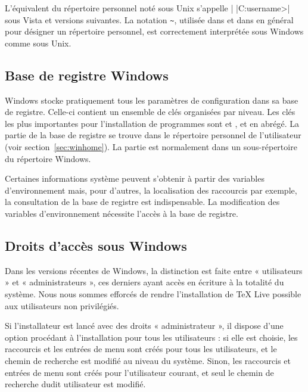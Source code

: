\documentclass[german, english, french]{article}
\renewcommand{\TL}{\TeX{} Live\xspace}%
\begin{document}
L'équivalent du répertoire personnel noté  sous Unix s'appelle
|%
|C:\Utilisateurs\<username>| sous Vista et versions suivantes.  La notation
\verb|~|, utilisée dans  et dans \KPS{} en général pour
désigner un répertoire personnel, est correctement interprétée sous Windows
comme sous Unix.


\subsection{Base de registre Windows}
\label{sec:registry}

Windows stocke pratiquement tous les paramètres de configuration dans sa base de
registre. Celle-ci contient un ensemble de clés organisées par niveau.  Les clés
les plus importantes pour l'installation de programmes sont
 et ,  et
 en abrégé. La partie  de la base de registre se trouve
dans le répertoire personnel de l'utilisateur (voir
section~\ref{sec:winhome}). La partie  est normalement dans un
sous-répertoire du répertoire Windows.

Certaines informations système peuvent s'obtenir à partir des variables
d'environnement mais, pour d'autres, la localisation des raccourcis par exemple,
la consultation de la base de registre est indispensable.  La modification des
variables d'environnement nécessite l'accès à la base de registre.


\subsection{Droits d'accès sous Windows}
\label{sec:winpermissions}

Dans les versions récentes de Windows, la distinction est faite entre
« utilisateurs » et « administrateurs », ces derniers ayant accès en écriture
à la totalité du système. Nous nous sommes efforcés de rendre l'installation de
\TL{} possible aux utilisateurs non privilégiés.

Si l'installateur est lancé avec des droits « administrateur », il dispose d'une
option procédant à l'installation pour tous les utilisateurs : si elle est
choisie, les raccourcis et les entrées de menu sont créés pour tous les
utilisateurs, et le chemin de recherche est modifié au niveau du système. Sinon,
les raccourcis et entrées de menu sont créés pour l'utilisateur courant, et seul
le chemin de recherche dudit utilisateur est modifié.
\end{document}
